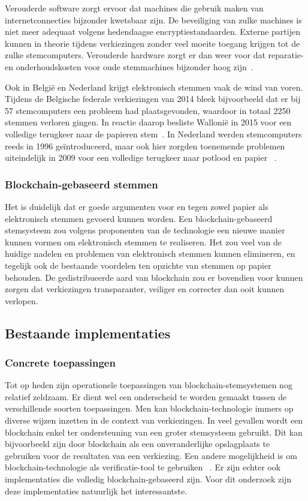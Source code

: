 			Verouderde software zorgt ervoor dat machines die gebruik maken van internetconnecties bijzonder kwetsbaar zijn. De beveiliging van zulke machines is niet meer adequaat volgens hedendaagse encryptiestandaarden. Externe partijen kunnen in theorie tijdens verkiezingen zonder veel moeite toegang krijgen tot de zulke stemcomputers. Verouderde hardware zorgt er dan weer voor dat reparatie- en onderhoudskosten voor oude stemmachines bijzonder hoog zijn~\autocite{Norden2015}.
			
			Ook in België en Nederland krijgt elektronisch stemmen vaak de wind van voren. Tijdens de Belgische federale verkiezingen van 2014 bleek bijvoorbeeld dat er bij 57 stemcomputers een probleem had plaatsgevonden, waardoor in totaal 2250 stemmen verloren gingen. In reactie daarop besliste Wallonië in 2015 voor een volledige terugkeer naar de papieren stem~\autocite{Maddens2018}.  In Nederland werden stemcomputers reeds in 1996 geïntroduceerd, maar ook hier zorgden toenemende problemen uiteindelijk in 2009 voor een volledige terugkeer naar potlood en papier ~\autocite{Schellevis2018}.
			
			\subsubsection{Blockchain-gebaseerd stemmen}
			Het is duidelijk dat er goede argumenten voor en tegen zowel papier als elektronisch stemmen gevoerd kunnen worden. Een blockchain-gebaseerd stemsysteem zou volgens proponenten van de technologie een nieuwe manier kunnen vormen om elektronisch stemmen te realiseren. Het zou veel van de huidige nadelen en problemen van elektronisch stemmen kunnen elimineren, en tegelijk ook de bestaande voordelen ten opzichte van stemmen op papier behouden. De gedistribueerde aard van blockchain zou er bovendien voor kunnen zorgen dat verkiezingen transparanter, veiliger en correcter dan ooit kunnen verlopen. 
			 
	\subsection{Bestaande implementaties}
			\subsubsection{Concrete toepassingen}
			Tot op heden zijn operationele toepassingen van blockchain-stemsystemen nog relatief zeldzaam.  Er dient wel  een onderscheid te worden gemaakt tussen de verschillende soorten toepassingen. Men kan  blockchain-technologie immers op diverse wijzen inzetten in de context van verkiezingen. In veel gevallen wordt een blockchain enkel ter ondersteuning van een groter stemsysteem gebruikt. Dit kan bijvoorbeeld zijn door blockchain als  een onveranderlijke opslagplaats te gebruiken voor de resultaten van een verkiezing. Een andere mogelijkheid is om blockchain-technologie als verificatie-tool te gebruiken  ~\autocite{Kshetri2018}. Er zijn echter ook implementaties die volledig blockchain-gebaseerd zijn. Voor dit onderzoek zijn deze implementaties natuurlijk het interessantste.
			
